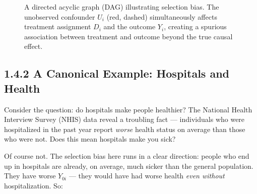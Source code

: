 \begin{figure}[htbp]
  \centering
  \caption{A directed acyclic graph (DAG) illustrating selection bias. The unobserved confounder $U_i$ (red, dashed) simultaneously affects treatment assignment $D_i$ and the outcome $Y_i$, creating a spurious association between treatment and outcome beyond the true causal effect.}
  \label{fig:ch01_selection_dag}
\end{figure}

\subsection{1.4.2 A Canonical Example: Hospitals and Health}

Consider the question: do hospitals make people healthier? The National Health Interview Survey (NHIS) data reveal a troubling fact --- individuals who were hospitalized in the past year report \textit{worse} health status on average than those who were not. Does this mean hospitals make you sick?

Of course not. The selection bias here runs in a clear direction: people who end up in hospitals are already, on average, much sicker than the general population. They have worse $Y_{0i}$ --- they would have had worse health \textit{even without} hospitalization. So:


